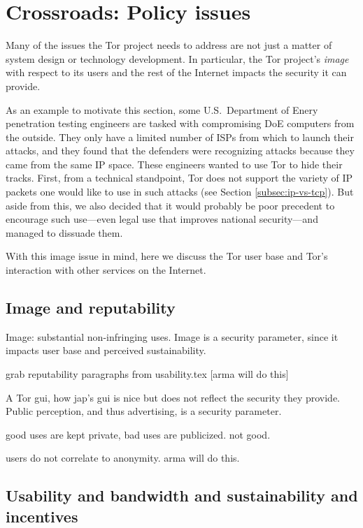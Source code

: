 \documentclass{llncs}
\begin{document}
\section{Crossroads: Policy issues}
\label{sec:crossroads-policy}

Many of the issues the Tor project needs to address are not just a
matter of system design or technology development. In particular, the
Tor project's \emph{image} with respect to its users and the rest of
the Internet impacts the security it can provide.

As an example to motivate this section, some U.S.~Department of Enery
penetration testing engineers are tasked with compromising DoE computers
from the outside. They only have a limited number of ISPs from which to
launch their attacks, and they found that the defenders were recognizing
attacks because they came from the same IP space. These engineers wanted
to use Tor to hide their tracks. First, from a technical standpoint,
Tor does not support the variety of IP packets one would like to use in
such attacks (see Section \ref{subsec:ip-vs-tcp}). But aside from this,
we also decided that it would probably be poor precedent to encourage
such use---even legal use that improves national security---and managed
to dissuade them.

With this image issue in mind, here we discuss the Tor user base and
Tor's interaction with other services on the Internet.
\subsection{Image and reputability}

Image: substantial non-infringing uses. Image is a security parameter,
since it impacts user base and perceived sustainability.

grab reputability paragraphs from usability.tex [arma will do this]

A Tor gui, how jap's gui is nice but does not reflect the security
they provide.
Public perception, and thus advertising, is a security parameter.

good uses are kept private, bad uses are publicized. not good.

users do not correlate to anonymity. arma will do this.

\subsection{Usability and bandwidth and sustainability and incentives}
\end{document}

